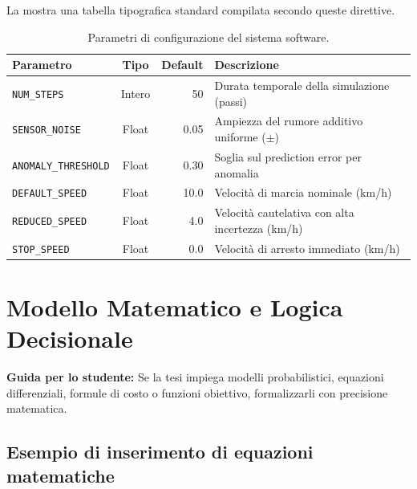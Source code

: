 La  mostra una tabella tipografica standard compilata secondo queste direttive.

\begin{table}[htbp]
\centering
\small
\caption{Parametri di configurazione del sistema software.}
\label{tab:parametri-esempio}
\renewcommand{\arraystretch}{1.3}
\begin{tabular}{l c r l}
\toprule
\textbf{Parametro} & \textbf{Tipo} & \textbf{Default} & \textbf{Descrizione} \\
\midrule
\texttt{NUM\_STEPS}          & Intero  & 50    & Durata temporale della simulazione (passi) \\
\texttt{SENSOR\_NOISE}       & Float   & 0.05  & Ampiezza del rumore additivo uniforme ($\pm$) \\
\texttt{ANOMALY\_THRESHOLD}  & Float   & 0.30  & Soglia sul prediction error per anomalia \\
\texttt{DEFAULT\_SPEED}      & Float   & 10.0  & Velocità di marcia nominale (km/h) \\
\texttt{REDUCED\_SPEED}      & Float   & 4.0   & Velocità cautelativa con alta incertezza (km/h) \\
\texttt{STOP\_SPEED}         & Float   & 0.0   & Velocità di arresto immediato (km/h) \\
\bottomrule
\end{tabular}
\end{table}


\section{Modello Matematico e Logica Decisionale}
\label{sec:modello-matematico}

\textbf{Guida per lo studente:} Se la tesi impiega modelli probabilistici, equazioni differenziali, formule di costo o funzioni obiettivo, formalizzarli con precisione matematica.


\subsection{Esempio di inserimento di equazioni matematiche}
\label{sec:esempi-equazioni}

